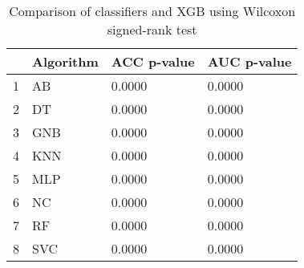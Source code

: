 \begin{table}
\footnotesize
\caption{Comparison of classifiers and XGB using Wilcoxon signed-rank test}
\label{tab:wilcoxon comparison}
\begin{tabular}{llll}
\hline
 & Algorithm & ACC p-value & AUC p-value \\
\hline
1 & AB & 0.0000 & 0.0000 \\
2 & DT & 0.0000 & 0.0000 \\
3 & GNB & 0.0000 & 0.0000 \\
4 & KNN & 0.0000 & 0.0000 \\
5 & MLP & 0.0000 & 0.0000 \\
6 & NC & 0.0000 & 0.0000 \\
7 & RF & 0.0000 & 0.0000 \\
8 & SVC & 0.0000 & 0.0000 \\
\hline
\end{tabular}
\end{table}
